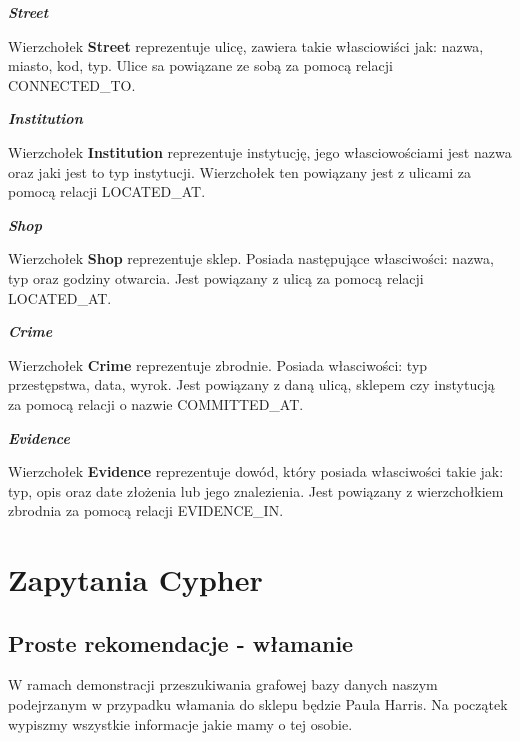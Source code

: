 \documentclass[a4paper,12pt]{article}
\begin{document}
\begin{center}
    \textbf{\textit{Street}}
\end{center}

Wierzchołek \textbf{Street} reprezentuje ulicę, zawiera takie własciowiści jak: nazwa, miasto, kod, typ. Ulice sa powiązane ze sobą za pomocą relacji CONNECTED\_TO.

\begin{center}
    \textbf{\textit{Institution}}
\end{center}

Wierzchołek \textbf{Institution} reprezentuje instytucję, jego własciowościami jest nazwa oraz jaki jest to typ instytucji. Wierzchołek ten powiązany jest z ulicami za pomocą relacji LOCATED\_AT.

\begin{center}
    \textbf{\textit{Shop}}
\end{center}

Wierzchołek \textbf{Shop} reprezentuje sklep. Posiada następujące własciwości: nazwa, typ oraz godziny otwarcia. Jest powiązany z ulicą za pomocą relacji LOCATED\_AT.

\begin{center}
    \textbf{\textit{Crime}}
\end{center}

Wierzchołek \textbf{Crime} reprezentuje zbrodnie. Posiada własciwości: typ przestępstwa, data, wyrok. Jest powiązany z daną ulicą, sklepem czy instytucją za pomocą relacji o nazwie COMMITTED\_AT.

\begin{center}
    \textbf{\textit{Evidence}}
\end{center}

Wierzchołek \textbf{Evidence} reprezentuje dowód, który posiada własciwości takie jak: typ, opis oraz date złożenia lub jego znalezienia. Jest powiązany z wierzchołkiem zbrodnia za pomocą relacji EVIDENCE\_IN.

\section{Zapytania Cypher}

\subsection{Proste rekomendacje - włamanie}

W ramach demonstracji przeszukiwania grafowej bazy danych naszym podejrzanym w przypadku włamania do sklepu będzie Paula Harris. Na początek wypiszmy wszystkie informacje jakie mamy o tej osobie.
\end{document}
